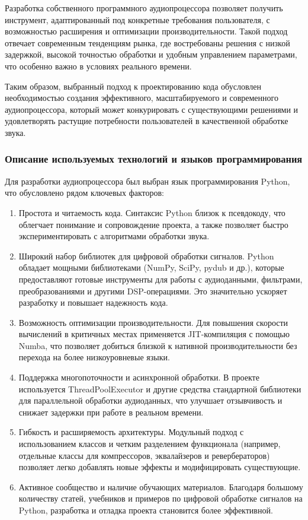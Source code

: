 Разработка собственного программного аудиопроцессора позволяет получить инструмент, адаптированный под конкретные требования пользователя, с возможностью расширения и оптимизации производительности. Такой подход отвечает современным тенденциям рынка, где востребованы решения с низкой задержкой, высокой точностью обработки и удобным управлением параметрами, что особенно важно в условиях реального времени.

Таким образом, выбранный подход к проектированию кода обусловлен необходимостью создания эффективного, масштабируемого и современного аудиопроцессора, который может конкурировать с существующими решениями и удовлетворять растущие потребности пользователей в качественной обработке звука.

\subsubsection{ Описание используемых технологий и языков программирования}

Для разработки аудиопроцессора был выбран язык программирования Python, что обусловлено рядом ключевых факторов:
\begin{enumerate}
	\item Простота и читаемость кода. Синтаксис Python близок к псевдокоду, что облегчает понимание и сопровождение проекта, а также позволяет быстро экспериментировать с алгоритмами обработки звука.
	\item Широкий набор библиотек для цифровой обработки сигналов. Python обладает мощными библиотеками (NumPy, SciPy, pydub и др.), которые предоставляют готовые инструменты для работы с аудиоданными, фильтрами, преобразованиями и другими DSP-операциями. Это значительно ускоряет разработку и повышает надежность кода.
	\item Возможность оптимизации производительности. Для повышения скорости вычислений в критичных местах применяется JIT-компиляция с помощью Numba, что позволяет добиться близкой к нативной производительности без перехода на более низкоуровневые языки.
	\item Поддержка многопоточности и асинхронной обработки. В проекте используется ThreadPoolExecutor и другие средства стандартной библиотеки для параллельной обработки аудиоданных, что улучшает отзывчивость и снижает задержки при работе в реальном времени.
	\item Гибкость и расширяемость архитектуры. Модульный подход с использованием классов и четким разделением функционала (например, отдельные классы для компрессоров, эквалайзеров и ревербераторов) позволяет легко добавлять новые эффекты и модифицировать существующие.
	\item Активное сообщество и наличие обучающих материалов. Благодаря большому количеству статей, учебников и примеров по цифровой обработке сигналов на Python, разработка и отладка проекта становится более эффективной.
\end{enumerate}

